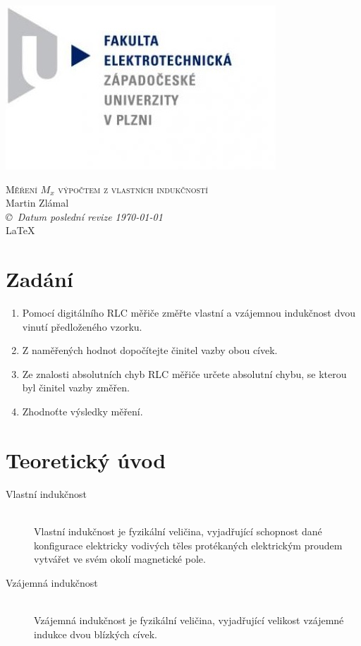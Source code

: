 \documentclass[12pt]{article} %
\newcommand{\bigsize}{\fontsize{35pt}{20pt}\selectfont}
\begin{document}
\begin{titlepage}
	\includegraphics[scale=0.7]{logo.jpg}
	\vspace*{\fill}
	\begin{center}
		\textsc{\LARGE \bigsize Měření $M_x$ výpočtem z vlastních indukčností}\\[1cm]
		Martin Zlámal \\[1cm]
		{\small\em \copyright \ Datum poslední revize \today } \\
		\LaTeX
	\end{center}
	\vspace*{\fill}
\end{titlepage}
\tableofcontents
\listoffigures
\listoftables
\newpage

\section{Zadání}
\begin{enumerate}
\item Pomocí digitálního RLC měřiče změřte vlastní a vzájemnou indukčnost dvou
vinutí předloženého vzorku.
\item Z naměřených hodnot dopočítejte činitel vazby obou cívek.
\item Ze znalosti absolutních chyb RLC měřiče určete absolutní chybu, se kterou byl
činitel vazby změřen.
\item Zhodnoťte výsledky měření.
\end{enumerate}

\section{Teoretický úvod}
\begin{description}
\item[Vlastní indukčnost] \hfill \\
Vlastní indukčnost je fyzikální veličina, vyjadřující schopnost dané konfigurace elektricky vodivých těles protékaných elektrickým proudem vytvářet ve svém okolí magnetické pole.
\item[Vzájemná indukčnost] \hfill \\
Vzájemná indukčnost je fyzikální veličina, vyjadřující velikost vzájemné indukce dvou blízkých cívek.
\end{description}
\end{document}
